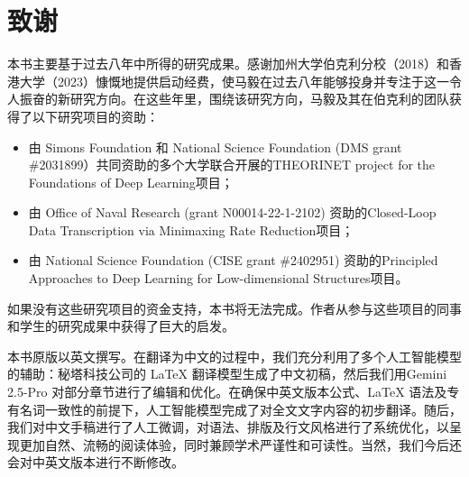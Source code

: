 \documentclass[../../book-main_zh.tex]{subfiles}
\begin{document}
\chapter*{致谢}
本书主要基于过去八年中所得的研究成果。感谢加州大学伯克利分校（2018）和香港大学（2023）慷慨地提供启动经费，使马毅在过去八年能够投身并专注于这一令人振奋的新研究方向。在这些年里，围绕该研究方向，马毅及其在伯克利的团队获得了以下研究项目的资助：

\begin{itemize}
    \item 由 Simons Foundation 和 National Science Foundation (DMS grant \#2031899）共同资助的多个大学联合开展的THEORINET project for the Foundations of Deep Learning项目；%
    \item 由 Office of Naval Research (grant N00014-22-1-2102) 资助的Closed-Loop Data Transcription via Minimaxing Rate Reduction项目；%
    \item 由 National Science Foundation (CISE grant \#2402951) 资助的Principled Approaches to Deep Learning for Low-dimensional Structures项目。%
\end{itemize} 

如果没有这些研究项目的资金支持，本书将无法完成。作者从参与这些项目的同事和学生的研究成果中获得了巨大的启发。


本书原版以英文撰写。在翻译为中文的过程中，我们充分利用了多个人工智能模型的辅助：秘塔科技公司的 LaTeX 翻译模型生成了中文初稿，然后我们用Gemini 2.5-Pro 对部分章节进行了编辑和优化。在确保中英文版本公式、LaTeX 语法及专有名词一致性的前提下，人工智能模型完成了对全文文字内容的初步翻译。随后，我们对中文手稿进行了人工微调，对语法、排版及行文风格进行了系统优化，以呈现更加自然、流畅的阅读体验，同时兼顾学术严谨性和可读性。当然，我们今后还会对中英文版本进行不断修改。
\end{document}

